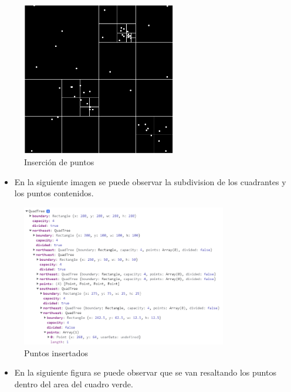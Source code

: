 \documentclass{article}
\begin{document}
\begin{figure}[htbp]
\centering
\includegraphics[width=0.6\textwidth]{img/quadtree_insert.png}
\caption{Inserción de puntos}
\label{fig:quadtree_insert}
\end{figure}

\begin{itemize}
\item En la siguiente imagen se puede observar la subdivision de los cuadrantes y los puntos contenidos.
\end{itemize}

\begin{figure}[htbp]
\centering
\includegraphics[width=0.8\textwidth]{img/quadtree_insert_data.png}
\caption{Puntos insertados}
\label{fig:quadtree_insert_data}
\end{figure}

\begin{itemize}
\item En la siguiente figura se puede observar que se van resaltando los puntos dentro del area del cuadro verde.
\end{itemize}
\end{document}
